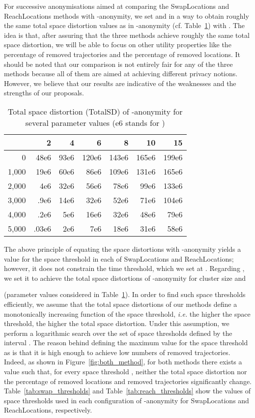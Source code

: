 For successive anonymisations aimed at comparing the
SwapLocations and ReachLocations methods with -anonymity,
we set  and  in a way to obtain roughly the same
total space distortion values as in -anonymity
(cf. Table~\ref{tab:totalsd}) with .
The idea is that, after assuring that the three methods achieve
roughly the same total space distortion,
we will be able to focus on other utility properties
like the percentage of removed trajectories
and the percentage of removed locations. It should be
noted that our comparison is not entirely fair for any of
the three methods because all of them are aimed at achieving
different privacy notions. However, we believe that our
results are indicative of the weaknesses and the strengths of
our proposals.

\begin{table}[!ht]
\centering
\begin{tabular}{|r|r|r|r|r|r|r|}
\hline
   & 2 & 4 & 6 & 8 & 10 & 15 \\
\hline
0 & 48e6 & 93e6 & 120e6 & 143e6 & 165e6 & 199e6 \\
1,000 & 19e6 & 60e6 & 86e6 & 109e6 & 131e6 & 165e6 \\
2,000 & 4e6 & 32e6 & 56e6 & 78e6 & 99e6 & 133e6 \\
3,000 & .9e6 & 14e6 & 32e6 & 52e6 & 71e6 & 104e6 \\
4,000 & .2e6 & 5e6 & 16e6 & 32e6 & 48e6 & 79e6 \\
5,000 & .03e6 & 2e6 & 7e6 & 18e6 & 31e6 & 58e6 \\
\hline
\end{tabular}
\caption{Total space distortion (TotalSD) of -anonymity
for several parameter values (e6 stands for )}
\label{tab:totalsd}
\end{table}

The above principle of equating the space distortions
with -anonymity yields a value for the space threshold
 in each of SwapLocations and ReachLocations; however,
it does not constrain the time threshold, which we set at .
Regarding , we set it to achieve the total space
distortions of -anonymity
for cluster size  and

(parameter values considered in Table~\ref{tab:totalsd}).
In order to find such space thresholds efficiently, we assume that
the total space distortions of our methods define a monotonically
increasing function of the space threshold, {\em i.e.} the higher
the space threshold, the higher the total space distortion.
Under this assumption, we perform a logarithmic search over the set
of space thresholds defined by the interval . The reason behind
defining the maximum value for the space threshold as  is
that it is high enough to achieve low numbers of removed trajectories.
Indeed, as shown in Figure~\ref{fig:both_method}, for both methods there
exists a value  such
that, for every space threshold , neither the total
space distortion nor the percentage of removed locations and
removed trajectories significantly change. Table~\ref{tab:swap_thresholds}
and Table~\ref{tab:reach_thresholds} show the values of space thresholds
used in each configuration of -anonymity for
SwapLocations and ReachLocations, respectively.


